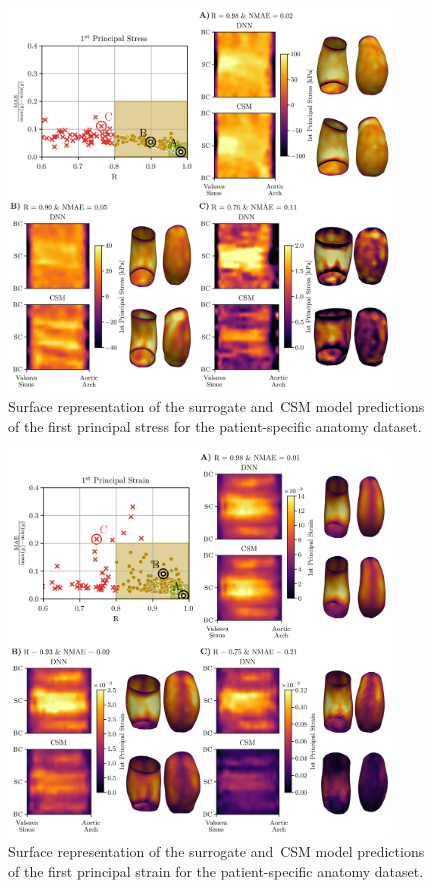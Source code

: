 \documentclass[a4paper,fleqn]{cas-sc}
\begin{document}
    \begin{figure}
      \centering
      \includegraphics[width=0.9\textwidth]{fig6}
      \caption{Surface representation of the surrogate and~\gls{CSM} model predictions of the first principal stress for the patient-specific anatomy dataset.}
      \label{fig:surface_representationPSStress}
    \end{figure}

    \begin{figure}
      \centering
      \includegraphics[width=0.9\textwidth]{fig7}
      \caption{Surface representation of the surrogate and~\gls{CSM} model predictions of the first principal strain for the patient-specific anatomy dataset.}
      \label{fig:surface_representationPSStrain}
    \end{figure}
\end{document}
